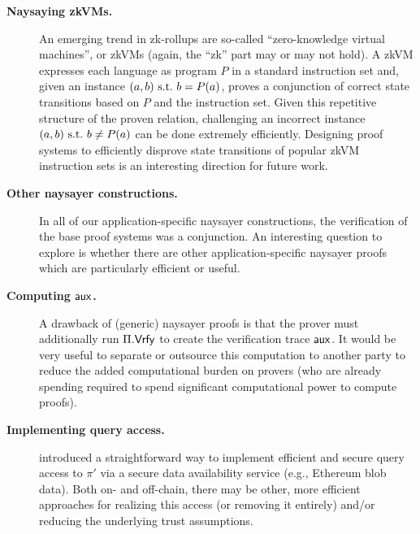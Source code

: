 \begin{description}
    \item[\textbf{Naysaying zkVMs.}] An emerging trend in zk-rollups are so-called ``zero{\hyp}knowledge virtual machines'', or zkVMs (again, the ``zk'' part may or may not hold). A zkVM expresses each language as program $P$ in a standard instruction set and, given an instance $(a,b) \mathrm{~s.t.~} b = P(a)$, proves a conjunction of correct state transitions based on $P$ and the instruction set. Given this repetitive structure of the proven relation, challenging an incorrect instance $(a,b) \mathrm{~s.t.~} b \neq P(a)$ can be done extremely efficiently. Designing proof systems to efficiently disprove state transitions of popular zkVM instruction sets is an interesting direction for future work.

    \item[\textbf{Other naysayer constructions.}] In all of our application-specific naysayer constructions, the verification of the base proof systems was a conjunction. An interesting question to explore is whether there are other application-specific naysayer proofs which are particularly efficient or useful.
    
    \item[\textbf{Computing $\mathsf{aux}$.}] A drawback of (generic) naysayer proofs is that the prover must additionally run $\Pi.\mathsf{Vrfy}$ to create the verification trace $\mathsf{aux}$. It would be very useful to separate or outsource this computation to another party to reduce the added computational burden on provers (who are already spending required to spend significant computational power to compute proofs).

    \item[\textbf{Implementing query access.}]  introduced a straightforward way to implement efficient and secure query access to $\pi'$ via a secure data availability service (e.g., Ethereum blob data). Both on- and off-chain, there may be other, more efficient approaches for realizing this access (or removing it entirely) and/or reducing the underlying trust assumptions.
\end{description}